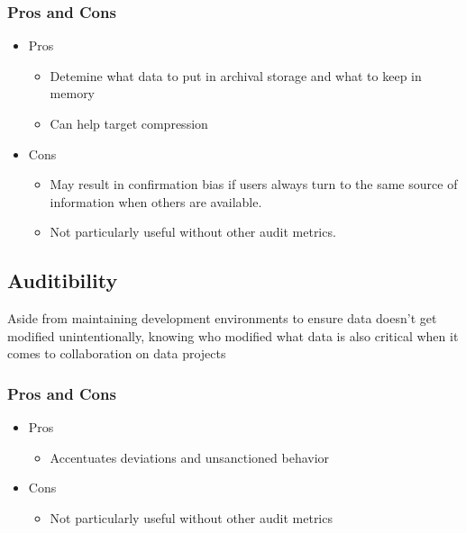\documentclass[12pt,a4paper]{article}
\begin{document}
\subsubsection{Pros and Cons}

\begin{itemize}
	\item Pros
		\begin{itemize}
			\item Detemine what data to put in archival storage and what to keep in memory
			\item Can help target compression 
		\end{itemize}
	\item Cons 
		\begin{itemize}
			\item May result in confirmation bias if users always turn to the same source of information when others are available.
			\item Not particularly useful without other audit metrics.
		\end{itemize}
\end{itemize}


\subsection{Auditibility}

Aside from maintaining development environments to ensure data doesn’t get modified unintentionally, knowing who modified what data is also critical when it comes to collaboration on data projects

\subsubsection{Pros and Cons}

\begin{itemize}
	\item Pros
		\begin{itemize}
			\item Accentuates deviations and unsanctioned behavior
		\end{itemize}
	\item Cons 
		\begin{itemize}
			\item Not particularly useful without other audit metrics
		\end{itemize}
\end{itemize}
\end{document}

